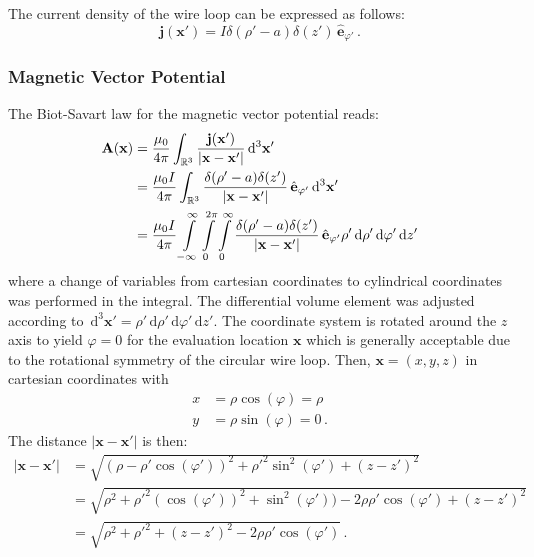 The current density of the wire loop can be expressed as follows:
\begin{equation}
  \mathbf{j}(\mathbf{x}') = I \delta(\rho' - a) \delta(z') \,\hat{\mathbf{e}}_{\varphi'} \, .
\end{equation}

\subsubsection{Magnetic Vector Potential}
The Biot-Savart law for the magnetic vector potential reads:
\begin{align}
  \mathbf{A}(\mathbf{x}) &= \frac{\mu_0  }{4 \pi}
                            \int_{\mathbb{R}^3}
                              \frac{\mathbf{j}(\mathbf{x}')}{|\mathbf{x} - \mathbf{x}'|} \,\mathrm{d}^3\mathbf{x}' \nonumber \\
             ~           &= \frac{\mu_0 I}{4 \pi}
                            \int_{\mathbb{R}^3}
                              \frac{\delta(\rho' - a) \delta(z')}{|\mathbf{x} - \mathbf{x}'|} \,\hat{\mathbf{e}}_{\varphi'}
                              \,\mathrm{d}^3\mathbf{x}' \nonumber \\
             ~           &= \frac{\mu_0 I}{4 \pi}
                            \int\limits_{-\infty}^{\infty} \int\limits_{0}^{2 \pi} \int\limits_{0}^{\infty}
                              \frac{\delta(\rho' - a) \delta(z')}{|\mathbf{x} - \mathbf{x}'|} \,\hat{\mathbf{e}}_{\varphi'}
                              \rho' \,\mathrm{d} \rho' \,\mathrm{d} \varphi'  \,\mathrm{d} z' \label{eqn:vecpot_loop_general}
\end{align}
where a change of variables from cartesian coordinates to cylindrical coordinates was performed in the integral.
The differential volume element was adjusted according to
$\,\mathrm{d}^3\mathbf{x}' = \rho' \,\mathrm{d} \rho' \,\mathrm{d} \varphi'  \,\mathrm{d} z'$.
The coordinate system is rotated around the $z$ axis to yield $\varphi=0$ for the evaluation location $\mathbf{x}$
which is generally acceptable due to the rotational symmetry of the circular wire loop.
Then, $\mathbf{x} = (x, y, z)$ in cartesian coordinates with
\begin{align}
  x &= \rho \cos(\varphi) = \rho \\
  y &= \rho \sin(\varphi) = 0    \, .
\end{align}
The distance $|\mathbf{x} - \mathbf{x}'|$ is then:
\begin{align}
  |\mathbf{x} - \mathbf{x}'| &= \sqrt{(\rho - \rho' \cos(\varphi'))^2 + \rho'^2 \sin^2(\varphi') + (z - z')^2} \nonumber \\
              ~              &= \sqrt{ \rho^2 + \rho'^2 (\cos(\varphi'))^2 + \sin^2(\varphi')) - 2 \rho \rho' \cos(\varphi') + (z - z')^2} \nonumber \\
              ~              &= \sqrt{ \rho^2 + \rho'^2 + (z - z')^2 - 2 \rho \rho' \cos(\varphi')} \, .
\end{align}
